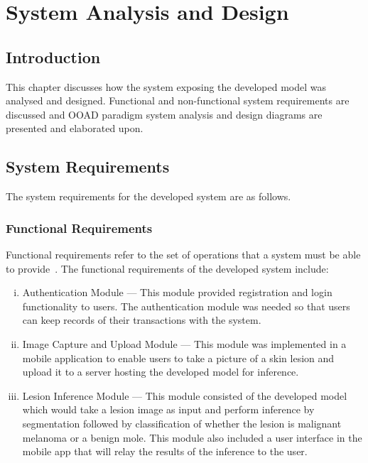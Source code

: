 \documentclass[12pt, a4paper]{article}
\begin{document}
\section{System Analysis and Design}
\subsection{Introduction}
This chapter discusses how the system exposing the developed model was analysed and designed. Functional and non-functional system requirements are discussed and OOAD paradigm system analysis and design diagrams are presented and elaborated upon.
\subsection{System Requirements}
The system requirements for the developed system are as follows.
\subsubsection{Functional Requirements}
Functional requirements refer to the set of operations that a system must be able to provide~\citep{glinz2007non}. The functional requirements of the developed system include:
\begin{enumerate}[i.]
    \item Authentication Module --- This module provided registration and login functionality to users. The authentication module was needed so that users can keep records of their transactions with the system.
    \item Image Capture and Upload Module --- This module was implemented in a mobile application to enable users to take a picture of a skin lesion and upload it to a server hosting the developed model for inference.
    \item Lesion Inference Module --- This module consisted of the developed model which would take a lesion image as input and perform inference by segmentation followed by classification of whether the lesion is malignant melanoma or a benign mole. This module also included a user interface in the mobile app that will relay the results of the inference to the user.
\end{enumerate}
\end{document}
